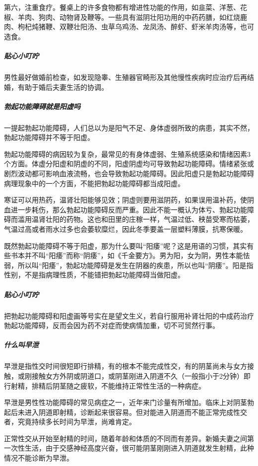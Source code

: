 第六，注重食疗。餐桌上的许多食物都有增进性功能的作用，如韭菜、洋葱、花椒、羊肉、狗肉、动物肾及鞭等。一些具有滋阴壮阳功用的中药药膳，如红烧鹿肉、枸杞炖猪鞭、双鞭壮阳汤、虫草乌鸡汤、龙凤汤、醉虾、虾米羊肉汤等，也可选食。

\subparagraph{贴心小叮咛}

男性最好做婚前检查，如发现隐睾、生殖器官畸形及其他慢性疾病时应治疗后再结婚，有助于婚后夫妻生活的协调。

\subparagraph{勃起功能障碍就是阳虚吗}

一提起勃起功能障碍，人们总以为是阳气不足、身体虚弱所致的病患，其实不然，勃起功能障碍并不等于阳虚。

勃起功能障碍的病因较为复杂，最常见的有身体虚弱、生殖系统感染和情绪因素3个方面。体虚分阳虚和阴虚的不同，阳虚阴虚均可导致勃起功能障碍。情绪紧张或剧烈波动都可影响血液流畅，也会导致勃起功能障碍。因此阳虚只是勃起功能障碍病理现象中的一个方面，不能把勃起功能障碍都当成阳虚。

寒证可以用热药，温肾壮阳能够见效；阴虚则要用滋阴药，如果误用温补药，使阴血进一步耗伤，那么勃起功能障碍反而严重。因此不能一概认为体亏、勃起功能障碍而滥用温肾壮阳的药物。这也和田里的庄稼一样，气温过低、秧苗受寒而枯萎，气温过高或者雨水过多也会萎软糜烂，因此冬季要盖一层塑料薄膜，抗寒保暖。

既然勃起功能障碍不等于阳虚，那为什么要叫“阳痿”呢？这是用语的习惯，其实有些书本并不叫“阳痿”而称“阴痿”，如《千金要方》。男为阳，女为阴，男性本能怯弱，所以叫“阳痿”，勃起功能障碍是发生在阴器的疾患，所以也叫“阴痿”。阳是指性别，不是指病理性质，不能错把勃起功能障碍当做阳虚。

\subparagraph{贴心小叮咛}

把勃起功能障碍和阳虚画等号实在是望文生义，若自行服用补肾壮阳的中成药治疗勃起功能障碍，反而会因为药不对症而使病情加重，切不可贸然行事。

\subparagraph{什么叫早泄}

早泄是指性交时间很短即行排精，有的根本不能完成性交，有的阴茎尚未与女方接触，或刚接触女方外阴或阴道口，或阴茎刚进入阴道不久（一般指小于2分钟）即行射精，排精后阴茎随之疲软，不能维持正常性生活的一种病症。

早泄是男性性功能障碍的常见病症之一，近年来门诊量有所增加。临床上对阴茎勃起后未进入阴道即射精，诊断起来很容易。但对能进入阴道而不能正常完成性交者，究竟持续多长时间为早泄，尚难肯定。

正常性交从开始至射精的时间，随着年龄和体质的不同而有差异。新婚夫妻之间第一次性生活，由于交感神经高度兴奋，很可能阴茎刚刚进入阴道就发生射精，此种情况不能诊断为早泄。

